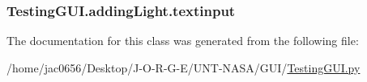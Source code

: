 \subsubsection[{\texorpdfstring{textinput}{textinput}}]{\setlength{\rightskip}{0pt plus 5cm}Testing\+G\+U\+I.\+adding\+Light.\+textinput}\hypertarget{classTestingGUI_1_1addingLight_a019891e6b3abbd0964de1e86a6a899e1}{}\label{classTestingGUI_1_1addingLight_a019891e6b3abbd0964de1e86a6a899e1}


The documentation for this class was generated from the following file\+:\begin{DoxyCompactItemize}
\item 
/home/jac0656/\+Desktop/\+J-\/\+O-\/\+R-\/\+G-\/\+E/\+U\+N\+T-\/\+N\+A\+S\+A/\+G\+U\+I/\hyperlink{GUI_2TestingGUI_8py}{Testing\+G\+U\+I.\+py}\end{DoxyCompactItemize}
